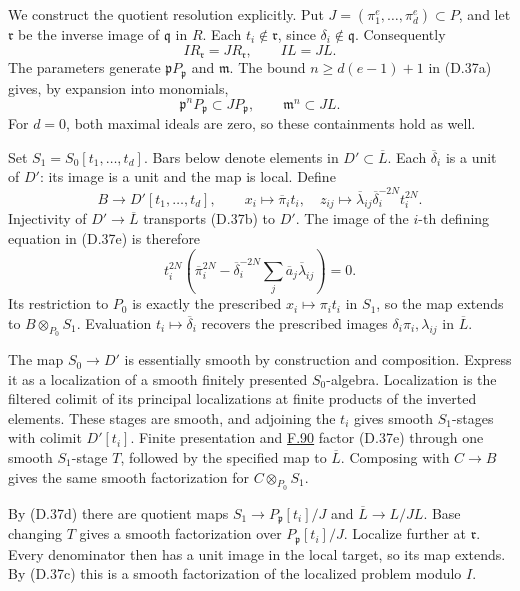 \documentclass[11pt,a4paper,openany]{report}
\begin{document}
We construct the quotient resolution explicitly. Put \(J=(\pi_1^e,\ldots,\pi_d^e)\subset P\), and let \(\mathfrak r\) be the inverse image of \(\mathfrak q\) in \(R\). Each \(t_i\notin\mathfrak r\), since \(\delta_i\notin\mathfrak q\). Consequently \[
IR_{\mathfrak r}=JR_{\mathfrak r},
\qquad IL=JL.
\tag{D.37c}
\] The parameters generate \(\mathfrak pP_{\mathfrak p}\) and \(\mathfrak m\). The bound \(n\ge d(e-1)+1\) in (D.37a) gives, by expansion into monomials, \[
\mathfrak p^nP_{\mathfrak p}\subset JP_{\mathfrak p},
\qquad\mathfrak m^n\subset JL.
\tag{D.37d}
\] For \(d=0\), both maximal ideals are zero, so these containments hold as well.

Set \(S_1=S_0[t_1,\ldots,t_d]\). Bars below denote elements in \(D'\subset\overline L\). Each \(\overline\delta_i\) is a unit of \(D'\): its image is a unit and the map is local. Define \[
B\longrightarrow D'[t_1,\ldots,t_d],
\qquad
x_i\longmapsto\overline\pi_it_i,\quad
z_{ij}\longmapsto
\overline\lambda_{ij}\overline\delta_i^{-2N}t_i^{2N}.
\tag{D.37e}
\] Injectivity of \(D'\to\overline L\) transports (D.37b) to \(D'\). The image of the \(i\)-th defining equation in (D.37e) is therefore \[
t_i^{2N}\left(\overline\pi_i^{2N}
-\overline\delta_i^{-2N}\sum_j\overline a_j\overline\lambda_{ij}\right)=0.
\] Its restriction to \(P_0\) is exactly the prescribed \(x_i\mapsto\pi_it_i\) in \(S_1\), so the map extends to \(B\otimes_{P_0}S_1\). Evaluation \(t_i\mapsto\overline\delta_i\) recovers the prescribed images \(\delta_i\pi_i,\lambda_{ij}\) in \(\overline L\).

The map \(S_0\to D'\) is essentially smooth by construction and composition. Express it as a localization of a smooth finitely presented \(S_0\)-algebra. Localization is the filtered colimit of its principal localizations at finite products of the inverted elements. These stages are smooth, and adjoining the \(t_i\) gives smooth \(S_1\)-stages with colimit \(D'[t_i]\). Finite presentation and \hyperref[AG-RG-S05-algebra-lemma-when-colimit]{F.90} factor (D.37e) through one smooth \(S_1\)-stage \(T\), followed by the specified map to \(\overline L\). Composing with \(C\to B\) gives the same smooth factorization for \(C\otimes_{P_0}S_1\).

By (D.37d) there are quotient maps \(S_1\to P_{\mathfrak p}[t_i]/J\) and \(\overline L\to L/JL\). Base changing \(T\) gives a smooth factorization over \(P_{\mathfrak p}[t_i]/J\). Localize further at \(\mathfrak r\). Every denominator then has a unit image in the local target, so its map extends. By (D.37c) this is a smooth factorization of the localized problem modulo \(I\).
\end{document}
